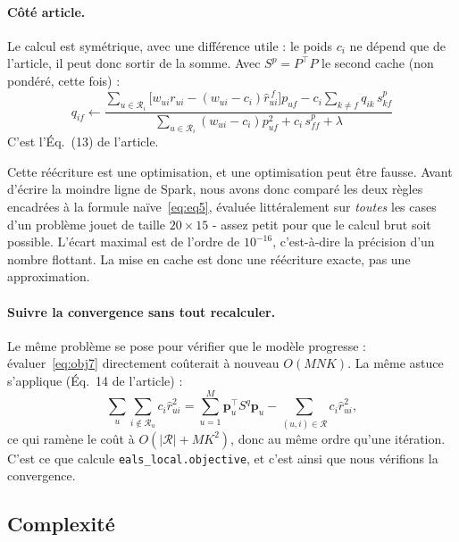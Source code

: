 \documentclass[11pt,a4paper]{article}
\begin{document}
\paragraph{Côté article.} Le calcul est symétrique, avec une différence utile : le poids
$c_i$ ne dépend que de l'article, il peut donc sortir de la somme. Avec
$S^p=P^{\top}P$ le second cache (non pondéré, cette fois) :
\begin{equation}\label{eq:qi}
\boxed{\;q_{if}\leftarrow
\frac{\displaystyle\sum_{u\in\mathcal{R}_i}\!\big[w_{ui}r_{ui}-(w_{ui}-c_i)\hat r^{\,f}_{ui}\big]p_{uf}
-c_i\sum_{k\neq f}q_{ik}\,s^p_{kf}}
{\displaystyle\sum_{u\in\mathcal{R}_i}(w_{ui}-c_i)p_{uf}^2+c_i\,s^p_{ff}+\lambda}\;}
\end{equation}
C'est l'Éq.~(13) de l'article.

Cette réécriture est une optimisation, et une optimisation peut être fausse. Avant
d'écrire la moindre ligne de Spark, nous avons donc comparé les deux règles encadrées à
la formule naïve~\eqref{eq:eq5}, évaluée littéralement sur \emph{toutes} les cases d'un
problème jouet de taille $20\times15$ - assez petit pour que le calcul brut soit
possible. L'écart maximal est de l'ordre de $10^{-16}$, c'est-à-dire la précision d'un
nombre flottant. La mise en cache est donc une réécriture exacte, pas une
approximation.

\paragraph{Suivre la convergence sans tout recalculer.} Le même problème se pose pour
vérifier que le modèle progresse : évaluer~\eqref{eq:obj7} directement coûterait à
nouveau $O(MNK)$. La même astuce s'applique (Éq.~14 de l'article) :
\begin{equation}\label{eq:objfast}
\sum_{u}\sum_{i\notin\mathcal{R}_u} c_i\hat r_{ui}^2
=\sum_{u=1}^{M}\mathbf p_u^{\top}S^q\mathbf p_u-\sum_{(u,i)\in\mathcal{R}}c_i\hat r_{ui}^2,
\end{equation}
ce qui ramène le coût à $O(|\mathcal{R}|+MK^2)$, donc au même ordre qu'une itération.
C'est ce que calcule \texttt{eals\_local.objective}, et c'est ainsi que nous vérifions
la convergence.

\subsection{Complexité}
\end{document}

